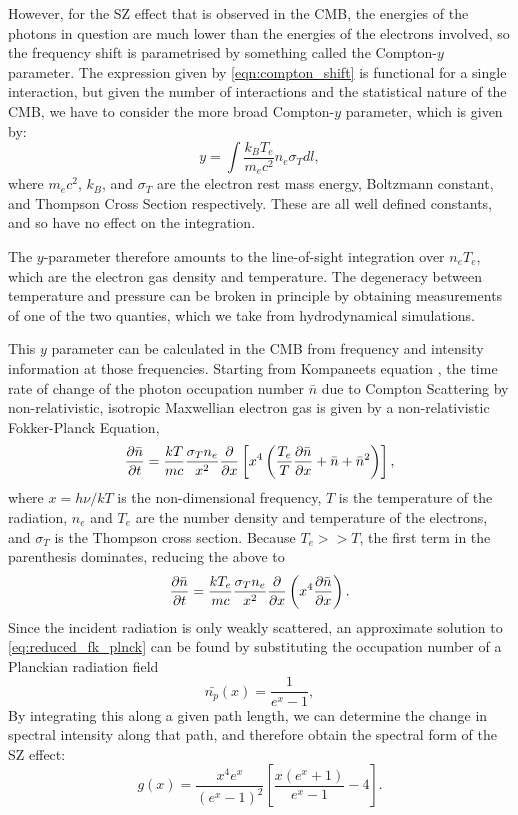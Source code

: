 However, for the SZ effect that is observed in the CMB, the energies of the photons in question are much lower than the energies of the electrons involved, so the frequency shift is parametrised by something called the Compton-$y$ parameter. The expression given by \eqref{eqn:compton_shift} is functional for a single interaction, but given the number of interactions and the statistical nature of the CMB, we have to consider the more broad Compton-$y$ parameter, which is given by:
\begin{equation}
y = \int \frac{k_B T_e}{m_e c^2} n_e \sigma_T d \mathit{l},
\label{eqn:y_param}
\end{equation}
where $m_e c^2$, $k_B$, and $\sigma_T$ are the electron rest mass energy, Boltzmann constant, and Thompson Cross Section respectively. These are all well defined constants, and so have no effect on the integration. 

\par The $y$-parameter therefore amounts to the line-of-sight integration over $n_e T_e$, which are the electron gas density and temperature. The degeneracy between temperature and pressure can be broken in principle by obtaining measurements of one of the two quanties, which we take from hydrodynamical simulations.

This $y$ parameter can be calculated in the CMB from frequency and intensity information at those frequencies. Starting from Kompaneets equation \citep{1957JETP....4..730K}, the time rate of change of the photon occupation number $\bar{n}$ due to Compton Scattering by non-relativistic, isotropic Maxwellian electron gas is given by a non-relativistic Fokker-Planck Equation, \citep{1995ARA&A..33..541R}
\begin{equation}
\pdv{\bar{n}}{t} = \frac{kT}{mc} \frac{\sigma_T n_e}{x^2} \pdv{x} \left[ x^4 \left( \frac{T_e}{T} \pdv{\bar{n}}{x} + \bar{n} + \bar{n}^2 \right) \right],
\label{eq:fk_plnck}
\end{equation}
where $x = h \nu / k T$ is the non-dimensional frequency, $T$ is the temperature of the radiation, $n_e$ and $T_e$ are the number density and temperature of the electrons, and $\sigma_T$ is the Thompson cross section. Because $T_e >> T$, the first term in the parenthesis dominates, reducing the above to 
\begin{equation}
\pdv{\bar{n} }{t} = \frac{k T_e}{m c} \frac{\sigma_T n_e}{x^2} \pdv{x} \left(x^4 \pdv{\bar{n}}{x} \right).
\label{eq:reduced_fk_plnck}
\end{equation}
Since the incident radiation is only weakly scattered, an approximate solution to \ref{eq:reduced_fk_plnck} can be found by substituting the occupation number of a Planckian radiation field
\begin{equation}
\bar{n_p}(x) = \frac{1}{e^x - 1},
\label{eq:plnk_occupation_no}
\end{equation}
By integrating this along a given path length, we can determine the change in spectral intensity along that path, and therefore obtain the spectral form of the SZ effect:
\begin{equation}
g(x) = \frac{x^4 e^x}{(e^x-1)^2} \left[ \frac{x (e^x+1)}{e^x -1 } - 4 \right].
\label{eq:spec_form_y}
\end{equation}

